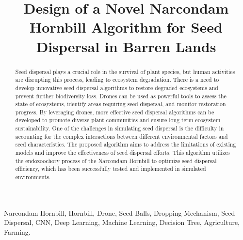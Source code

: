 \documentclass[conference]{IEEEtran}
\begin{document}
\title{Design of a Novel Narcondam Hornbill Algorithm for Seed Dispersal in Barren Lands}


 
\author{
\and
{}
\and
{}
}

\maketitle

\begin{abstract}
Seed dispersal plays a crucial role in the survival of plant species, but human activities are disrupting this process, leading to ecosystem degradation. There is a need to develop innovative seed dispersal algorithms to restore degraded ecosystems and prevent further biodiversity loss. Drones can be used as powerful tools to assess the state of ecosystems, identify areas requiring seed dispersal, and monitor restoration progress. By leveraging drones, more effective seed dispersal algorithms can be developed to promote diverse plant communities and ensure long-term ecosystem sustainability. One of the challenges in simulating seed dispersal is the difficulty in accounting for the complex interactions between different environmental factors and seed characteristics. The proposed algorithm aims to address the limitations of existing models and improve the effectiveness of seed dispersal efforts. This algorithm utilizes the endozoochory process of the Narcondam Hornbill to optimize seed dispersal efficiency, which has been successfully tested and implemented in simulated environments.
\end{abstract}

\begin{IEEEkeywords}
Narcondam Hornbill, Hornbill, Drone, Seed Balls, Dropping Mechanism, Seed Dispersal, CNN, Deep Learning, Machine Learning, Decision Tree, Agriculture, Farming.
\end{IEEEkeywords}
\end{document}
